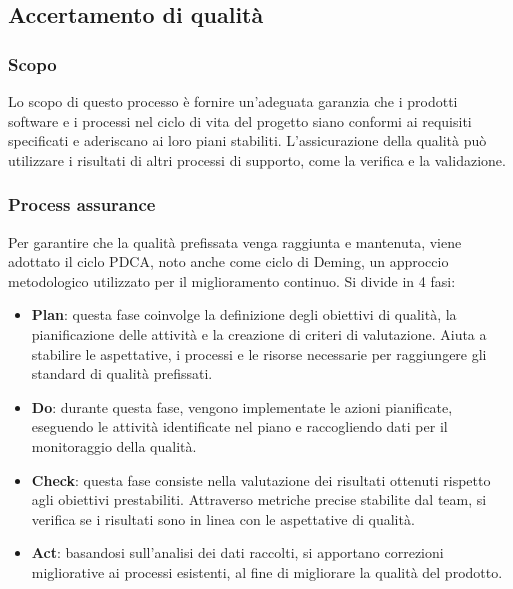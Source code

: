 \documentclass[10pt, a4paper]{article}
\begin{document}
\subsection{Accertamento di qualità}
\subsubsection{Scopo}
Lo scopo di questo processo è fornire un'adeguata garanzia che i prodotti software e i processi nel ciclo di vita del progetto siano conformi ai requisiti specificati e aderiscano ai loro piani stabiliti.
L'assicurazione della qualità può utilizzare i risultati di altri processi di supporto, come la verifica e la validazione.

\subsubsection{Process assurance}
Per garantire che la qualità prefissata venga raggiunta e mantenuta, viene adottato il ciclo PDCA, noto anche come ciclo di Deming, un approccio metodologico utilizzato per il miglioramento continuo. Si divide in 4 fasi:
\begin{itemize}
    \item \textbf{Plan}: questa fase coinvolge la definizione degli obiettivi di qualità, la pianificazione delle attività e la creazione di criteri di valutazione. Aiuta a stabilire le aspettative, i processi e le risorse necessarie per raggiungere gli standard di qualità prefissati.
    \item \textbf{Do}: durante questa fase, vengono implementate le azioni pianificate, eseguendo le attività identificate nel piano e raccogliendo dati per il monitoraggio della qualità.
    \item \textbf{Check}: questa fase consiste nella valutazione dei risultati ottenuti rispetto agli obiettivi prestabiliti. Attraverso metriche precise stabilite dal team, si verifica se i risultati sono in linea con le aspettative di qualità.
    \item \textbf{Act}: basandosi sull'analisi dei dati raccolti, si apportano correzioni migliorative ai processi esistenti, al fine di migliorare la qualità del prodotto.
\end{itemize}
\end{document}
